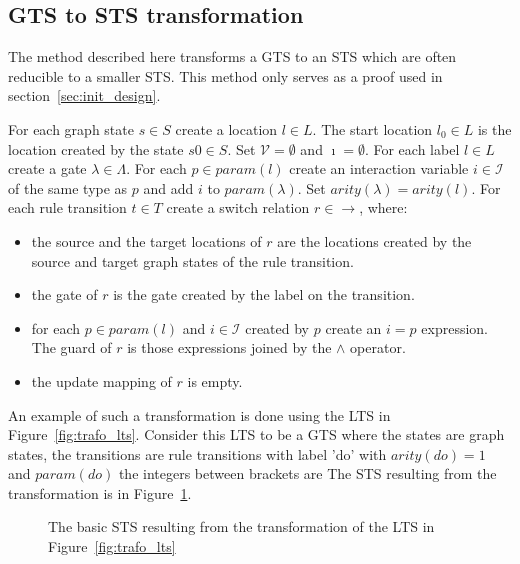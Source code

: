 \subsection{GTS to STS transformation}\label{sec:gts_sts_trafo}
The method described here transforms a GTS to an STS which are often reducible to a smaller STS. This method only serves as a proof used in section~\ref{sec:init_design}.

For each graph state $s \in S$ create a location $l \in L$. The start location $l_0 \in L$ is the location created by the state $s0 \in S$. Set $\mathcal{V} = \emptyset$ and $\imath = \emptyset$. For each label $l \in L$ create a gate $\lambda \in \Lambda$. For each $p \in \mathit{param}(l)$ create an interaction variable $i \in \mathcal{I}$ of the same type as $p$ and add $i$ to $param(\lambda)$. Set $\mathit{arity}(\lambda) = \mathit{arity}(l)$. For each rule transition $t \in T$ create a switch relation $r \in \rightarrow$, where:
\begin{itemize}
  \item the source and the target locations of $r$ are the locations created by the source and target graph states of the rule transition.
  \item the gate of $r$ is the gate created by the label on the transition.
  \item for each $p \in \mathit{param}(l)$ and $i \in \mathcal{I}$ created by $p$ create an $i = p$ expression. The guard of $r$ is those expressions joined by the $\land$ operator.
  \item the update mapping of $r$ is empty.
\end{itemize}

An example of such a transformation is done using the LTS in Figure~\ref{fig:trafo_lts}. Consider this LTS to be a GTS where the states are graph states, the transitions are rule transitions with label 'do' with $\mathit{arity(do)} = 1$ and $\mathit{param(do)}$ the integers between brackets are The STS resulting from the transformation is in Figure~\ref{fig:trafo_basic_sts}.

\begin{figure}[h]
  \begin{center}
    
  \end{center}
  \caption{The basic STS resulting from the transformation of the LTS in Figure~\ref{fig:trafo_lts}}
  \label{fig:trafo_basic_sts}
\end{figure}
